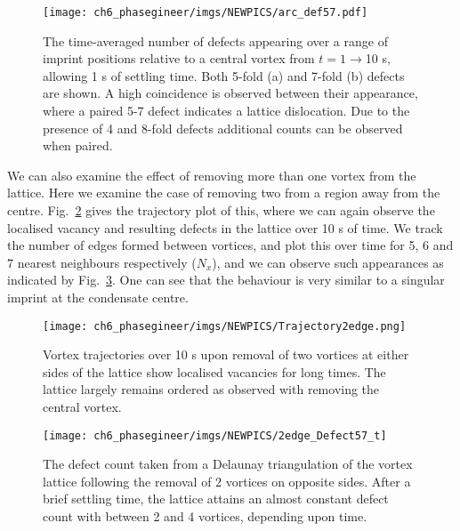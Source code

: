 \begin{figure}[H] \centering
    \texttt{[image: ch6\_phasegineer/imgs/NEWPICS/arc\_def57.pdf]}
    \caption{The time-averaged number of defects appearing over a range of imprint positions relative to a central vortex from $t=1\rightarrow$10 s, allowing 1 s of settling time. Both 5-fold (a) and 7-fold (b) defects are shown. A high coincidence is observed between their appearance, where a paired 5-7 defect indicates a lattice dislocation. Due to the presence of 4 and 8-fold defects additional counts can be observed when paired.} \label{fig:lattice_misalign}
\end{figure}

We can also examine the effect of removing more than one vortex from the lattice. Here we examine the case of removing two from a region away from the centre. Fig.~\ref{fig:traj_2vtx_edge} gives the trajectory plot of this, where we can again observe the localised vacancy and resulting defects in the lattice over 10 s of time. We track the number of edges formed between vortices, and plot this over time for 5, 6 and 7 nearest neighbours respectively ($N_x$), and we can observe such appearances as indicated by Fig.~\ref{fig:vtx_rem2_edge}. One can see that the behaviour is very similar to a singular imprint at the condensate centre.

\begin{figure}[H] \centering
    \texttt{[image: ch6\_phasegineer/imgs/NEWPICS/Trajectory2edge.png]}
    \caption{Vortex trajectories over 10 s upon removal of two vortices at either sides of the lattice show localised vacancies for long times. The lattice largely remains ordered as observed with removing the central vortex.}\label{fig:traj_2vtx_edge}
\end{figure}

\begin{figure}[H] \centering
    \texttt{[image: ch6\_phasegineer/imgs/NEWPICS/2edge\_Defect57\_t]}
    \caption{The defect count taken from a Delaunay triangulation of the vortex lattice following the removal of 2 vortices on opposite sides. After a brief settling time, the lattice attains an almost constant defect count with between 2 and 4 vortices, depending upon time.}\label{fig:remove7_defect}
    \label{fig:vtx_rem2_edge}
\end{figure}


